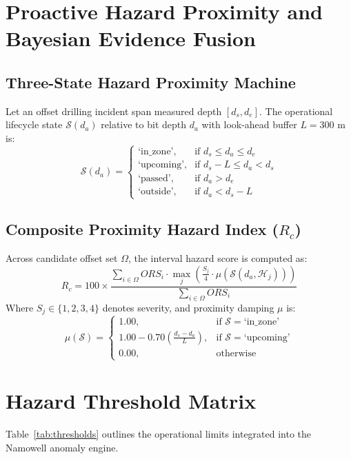 \documentclass[11pt,a4paper]{article}
\begin{document}
\section{Proactive Hazard Proximity and Bayesian Evidence Fusion}

\subsection{Three-State Hazard Proximity Machine}
Let an offset drilling incident span measured depth $[d_s, d_e]$. The operational lifecycle state $\mathcal{S}(d_a)$ relative to bit depth $d_a$ with look-ahead buffer $L = 300\text{ m}$ is:
\begin{equation}
\mathcal{S}(d_a) = \begin{cases} 
\text{`in\_zone'}, & \text{if } d_s \le d_a \le d_e \\
\text{`upcoming'}, & \text{if } d_s - L \le d_a < d_s \\
\text{`passed'}, & \text{if } d_a > d_e \\
\text{`outside'}, & \text{if } d_a < d_s - L
\end{cases}
\end{equation}

\subsection{Composite Proximity Hazard Index ($R_c$)}
Across candidate offset set $\Omega$, the interval hazard score is computed as:
\begin{equation}
R_c = 100 \times \frac{\sum_{i \in \Omega} ORS_i \cdot \max_{j} \left( \frac{S_j}{4} \cdot \mu(\mathcal{S}(d_a, \mathcal{H}_j)) \right)}{\sum_{i \in \Omega} ORS_i}
\end{equation}
Where $S_j \in \{1, 2, 3, 4\}$ denotes severity, and proximity damping $\mu$ is:
\begin{equation}
\mu(\mathcal{S}) = \begin{cases} 
1.00, & \text{if } \mathcal{S} = \text{`in\_zone'} \\
1.00 - 0.70 \left(\frac{d_s - d_a}{L}\right), & \text{if } \mathcal{S} = \text{`upcoming'} \\
0.00, & \text{otherwise}
\end{cases}
\end{equation}

\section{Hazard Threshold Matrix}
Table~\ref{tab:thresholds} outlines the operational limits integrated into the Namowell anomaly engine.
\end{document}
